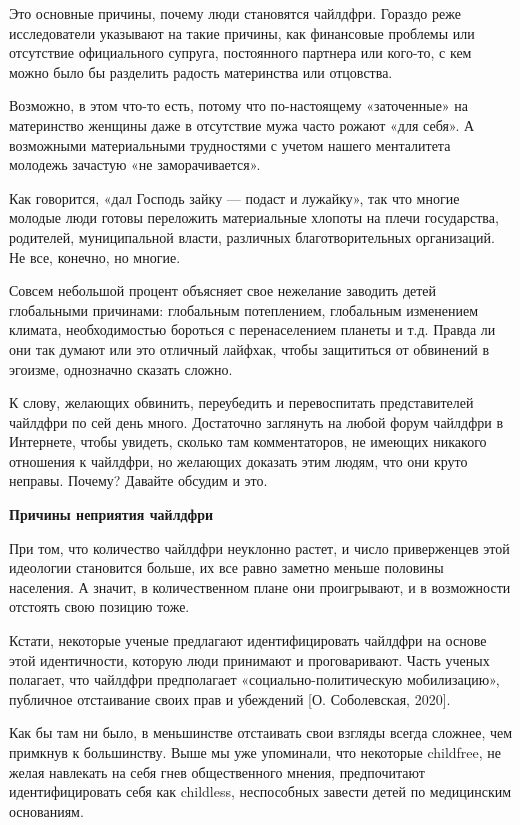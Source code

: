 Это основные причины, почему люди становятся чайлдфри. Гораздо реже исследователи указывают на такие причины, как финансовые проблемы или отсутствие официального супруга, постоянного партнера или кого-то, с кем можно было бы разделить радость материнства или отцовства.

Возможно, в этом что-то есть, потому что по-настоящему «заточенные» на материнство женщины даже в отсутствие мужа часто рожают «для себя». А возможными материальными трудностями с учетом нашего менталитета молодежь зачастую «не заморачивается».

Как говорится, «дал Господь зайку --- подаст и лужайку», так что многие молодые люди готовы переложить материальные хлопоты на плечи государства, родителей, муниципальной власти, различных благотворительных организаций. Не все, конечно, но многие.

Совсем небольшой процент объясняет свое нежелание заводить детей глобальными причинами: глобальным потеплением, глобальным изменением климата, необходимостью бороться с перенаселением планеты и т.д. Правда ли они так думают или это отличный лайфхак, чтобы защититься от обвинений в эгоизме, однозначно сказать сложно.

К слову, желающих обвинить, переубедить и перевоспитать представителей чайлдфри по сей день много. Достаточно заглянуть на любой форум чайлдфри в Интернете, чтобы увидеть, сколько там комментаторов, не имеющих никакого отношения к чайлдфри, но желающих доказать этим людям, что они круто неправы. Почему? Давайте обсудим и это.

\textbf{Причины неприятия чайлдфри}

При том, что количество чайлдфри неуклонно растет, и число приверженцев этой идеологии становится больше, их все равно заметно меньше половины населения. А значит, в количественном плане они проигрывают, и в возможности отстоять свою позицию тоже.

Кстати, некоторые ученые предлагают идентифицировать чайлдфри на основе этой идентичности, которую люди принимают и проговаривают. Часть ученых полагает, что чайлдфри предполагает «социально-политическую мобилизацию», публичное отстаивание своих прав и убеждений [О. Соболевская, 2020].

Как бы там ни было, в меньшинстве отстаивать свои взгляды всегда сложнее, чем примкнув к большинству. Выше мы уже упоминали, что некоторые childfree, не желая навлекать на себя гнев общественного мнения, предпочитают идентифицировать себя как childless, неспособных завести детей по медицинским основаниям.

